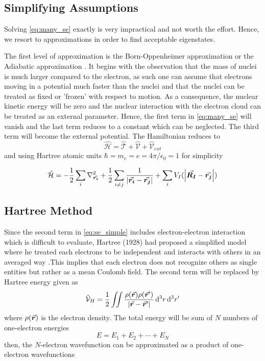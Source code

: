 \subsection{Simplifying Assumptions}
    Solving \eqref{eq:many_se} exactly is very impractical and not worth the effort. Hence, we resort to approximations in order to find acceptable eigenstates. 

    The first level of approximation is the Born-Oppenheimer approximation or the Adiabatic approximation \citep{Born1927}. It begins with the observation that the mass of nuclei is much larger compared to the electron, as such one can assume that electrons moving in a potential much faster than the nuclei and that the nuclei can be treated as fixed or 'frozen' with respect to motion. As a consequence, the nuclear kinetic energy will be zero and the nuclear interaction with the electron cloud  can be treated as an external parameter. Hence, the first  term in \eqref{eq:many_se} will vanish and the last term reduces to a constant which can be neglected. The third term will become the external potential. The Hamiltonian reduces to 
    \begin{equation}
        \hat{\mathcal{H}}  = \hat{\mathcal{T}} + \hat{\mathcal{V}} + \hat{\mathcal{V}}_{ext}
    \end{equation}
    and using Hartree atomic units $\hbar = m_e = e = 4 \pi / \epsilon_0 =1$ for simplicity 

    \begin{equation} \label{eq:se_simple}
        \hat{\mathcal{H}}  = - \frac{1}{2} \sum_i \laplacian_{\va*{r_i}} + \frac{1}{2} \sum_{i\neq j} \frac{1}{\abs{\va*{r_i} - \va*{r_j}}} + \sum_{i} V_{I}(\abs{\va*{R_I} - \va*{r_j}})
    \end{equation}
    \subsection{Hartree Method}
    Since the second term in \eqref{eq:se_simple} includes electron-electron interaction which is difficult to evaluate, Hartree (1928) had proposed a simplified model where he treated each electrons to be independent and interacts with others in an averaged way \citep{Hartree1928}.This implies that each  electron does not recognize others as single entities but rather as a mean Coulomb field. The second term will be replaced by Hartree energy given as 
    \begin{equation}
        \hat{\mathcal{V}}_H = \frac{1}{2} \iint \frac{\rho(\va*{r}) \rho(\va*{r}')}{\abs{{\va*{r} - \va*{r}'}}} \dd[3]{r} \dd[3]{r'}
    \end{equation}
    where $\rho(\va*{r})$ is the electron density. The total energy will be sum of $N$ numbers of one-electron energies
    \begin{equation}
        E = E_1 + E_2 + \cdots + E_N
    \end{equation}
    then, the $N$-electron wavefunction can be approximated as a product of one-electron wavefunctions

